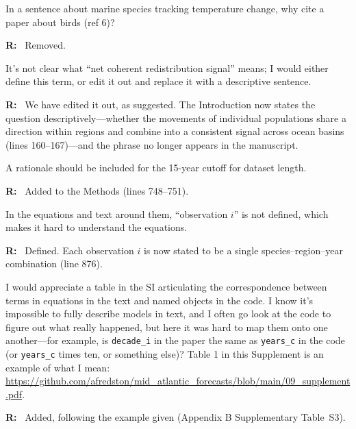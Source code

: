 \documentclass[11pt]{article}
\newcommand{\reviewer}[1]{\par\medskip\noindent\textcolor{revcolor}{#1}\par}
\newenvironment{reply}
{\par\smallskip\begingroup\color{replycolor}\noindent\textbf{R:}\ }
{\endgroup\par\medskip}
\begin{document}
\reviewer{In a sentence about marine species tracking temperature change, why cite a paper about birds (ref 6)?}

\begin{reply}
Removed. 
\end{reply}

\reviewer{It's not clear what ``net coherent redistribution signal'' means; I would either define this term, or edit it out and replace it with a descriptive sentence.}

\begin{reply}
We have edited it out, as suggested. The Introduction now states the question descriptively---whether the movements of individual populations share a direction within regions and combine into a consistent signal across ocean basins (lines 160--167)---and the phrase no longer appears in the manuscript.
\end{reply}

\reviewer{A rationale should be included for the 15-year cutoff for dataset length.}

\begin{reply}
Added to the Methods (lines 748--751).
\end{reply}

\reviewer{In the equations and text around them, ``observation $i$'' is not defined, which makes it hard to understand the equations.}

\begin{reply}
Defined. Each observation $i$ is now stated to be a single species--region--year combination (line 876).
\end{reply}

\reviewer{I would appreciate a table in the SI articulating the correspondence between terms in equations in the text and named objects in the code. I know it's impossible to fully describe models in text, and I often go look at the code to figure out what really happened, but here it was hard to map them onto one another---for example, is \texttt{decade\_i} in the paper the same as \texttt{years\_c} in the code (or \texttt{years\_c} times ten, or something else)? Table 1 in this Supplement is an example of what I mean: \url{https://github.com/afredston/mid_atlantic_forecasts/blob/main/09_supplement.pdf}.}

\begin{reply}
Added, following the example given (Appendix B Supplementary Table~S3).
\end{reply}
\end{document}
